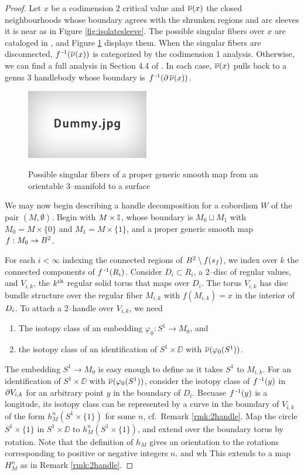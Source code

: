\begin{proof}
	Let $x$ be a codimension 2 critical value and $\overline{\nu}(x)$ the closed neighbourhoods whose boundary agrees with the shrunken regions and arc sleeves it is near as in Figure \ref{fig:isolatesleeve}.
	The possible singular fibers over $x$ are cataloged in \cite{Saeki}, and Figure \ref{fig:saekising} displays them.
	When the singular fibers are disconnected, $f^{\,\text{-}1}(\overline{\nu}(x))$ is categorized by the codimension 1 analysis.
	Otherwise, we can find a full analysis in Section 4.4 of \cite{CostThur08}.
	In each case, $\overline{\nu}(x)$ pulls back to a genus 3 handlebody whose boundary is $f^{\,\text{-}1}(\partial\,\overline{\nu}(x))$.
	
	\begin{figure}
		\centering
		\captionsetup{justification=centering}
		\caption{Possible singular fibers of a proper generic smooth map from an orientable 3--manifold to a surface}
		\includegraphics[height=3cm]{figures/dummy.jpg}
		\label{fig:saekising}
	\end{figure}
	
	We may now begin describing a handle decomposition for a cobordism $W$ of the pair $(M,\emptyset)$.
	Begin with $M\times\mathbb{I}$, whose boundary is $M_0\sqcup M_1$ with $M_0=M\times\{0\}$ and $M_1 = M\times\{1\}$, and a proper generic smooth map $f:M_0\to B^2$.

	For each $i<\infty$ indexing the connected regions of $B^2\setminus f(s_f)$, we index over $k$ the connected components of $f^{\,\text{-}1}(R_i)$.
	Consider $D_i\subset R_i$, a 2--disc of regular values, and $V_{i,k}$, the $k^{\text{th}}$ regular solid torus that maps over $D_i$.
	The torus $V_{i,k}$ has disc bundle structure over the regular fiber $M_{i,k}$ with $f(M_{i,k})=x$ in the interior of $D_i$.
	To attach a 2--handle over $V_{i,k}$, we need
	\begin{enumerate}
		\item The isotopy class of an embedding $\varphi_0:S^1\to M_0$, and
		\item the isotopy class of an identification of $S^1\times\DD$ with $\overline{\nu}(\varphi_0(S^1))$.
	\end{enumerate}
	The embedding $S^1\to M_0$ is easy enough to define as it takes $S^1$ to $M_{i,k}$.
	For an identification of $S^1\times\DD$ with $\overline{\nu}(\varphi_0(S^1))$, consider the isotopy class of $f^{\,\text{-}1}(y)$ in $\partial V_{i,k}$ for an arbitrary point $y$ in the boundary of $D_i$.
	Becuase $f^{\,\text{-}1}(y)$ is a longitude, its isotopy class can be represented by a curve in the boundary of $V_{i,k}$ of the form $h_{M}^n(S^1\times\{1\})$ for some $n$, cf.\ Remark \ref{rmk:2handle}.
	Map the circle $S^1\times\{1\}$ in $S^1\times\DD$ to $h_{M}^n(S^1\times\{1\})$, and extend over the boundary torus by rotation.
	Note that the definition of $h_M$ gives an orientation to the rotations corresponding to positive or negative integers $n$.
	 and wh
	This extends to a map $H_M^n$ as in Remark \ref{rmk:2handle}.


\end{proof}
